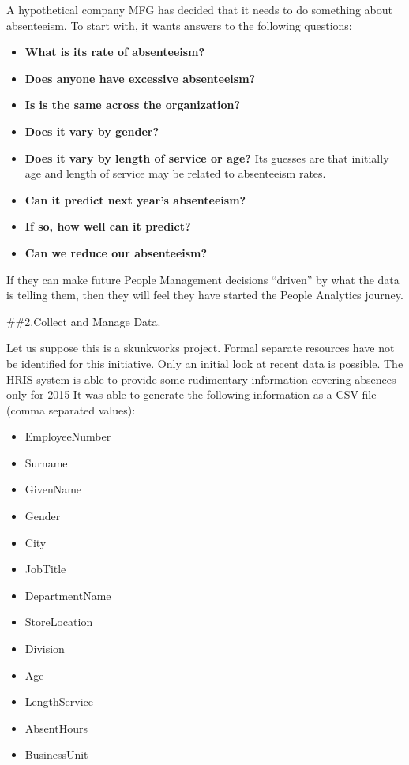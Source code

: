 \documentclass[12pt, krantz2,]{krantz}
\providecommand{\tightlist}{%
  \setlength{\itemsep}{0pt}\setlength{\parskip}{0pt}}
\begin{document}
A hypothetical company MFG has decided that it needs to do something about absenteeism.
To start with, it wants answers to the following questions:

\begin{itemize}
\tightlist
\item
  \textbf{What is its rate of absenteeism?}
\item
  \textbf{Does anyone have excessive absenteeism?}
\item
  \textbf{Is is the same across the organization?}
\item
  \textbf{Does it vary by gender?}
\item
  \textbf{Does it vary by length of service or age?} Its guesses are that initially age and length of service may be related to absenteeism rates.
\item
  \textbf{Can it predict next year's absenteeism?}
\item
  \textbf{If so, how well can it predict?}
\item
  \textbf{Can we reduce our absenteeism?}
\end{itemize}

If they can make future People Management decisions ``driven'' by what the data is telling them, then they will feel they have started the People Analytics journey.

\#\#2.Collect and Manage Data.

Let us suppose this is a skunkworks project. Formal separate resources have not be identified for this initiative.
Only an initial look at recent data is possible. The HRIS system is able to provide some rudimentary information covering absences only for 2015
It was able to generate the following information as a CSV file (comma separated values):

\begin{itemize}
\tightlist
\item
  EmployeeNumber
\item
  Surname
\item
  GivenName
\item
  Gender
\item
  City
\item
  JobTitle
\item
  DepartmentName
\item
  StoreLocation
\item
  Division
\item
  Age
\item
  LengthService
\item
  AbsentHours
\item
  BusinessUnit
\end{itemize}
\end{document}
